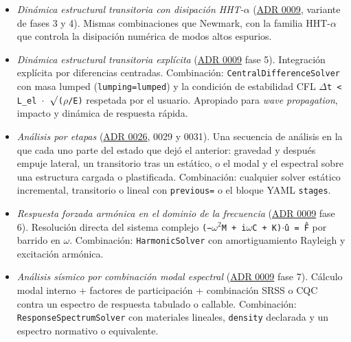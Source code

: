 \documentclass[11pt,oneside]{report}
\begin{document}
\begin{itemize}
  \item \textit{Dinámica estructural transitoria con disipación HHT-\ensuremath{\alpha}} (\hyperref[adr:0009]{ADR 0009}, variante de fases 3 y 4). Mismas combinaciones que Newmark, con la familia HHT-\ensuremath{\alpha} que controla la disipación numérica de modos altos espurios.
  \item \textit{Dinámica estructural transitoria explícita} (\hyperref[adr:0009]{ADR 0009} fase 5). Integración explícita por diferencias centradas. Combinación: \texttt{CentralDifferenceSolver} con masa lumped (\texttt{lumping=\textquotedbl{}lumped\textquotedbl{}}) y la condición de estabilidad CFL \texttt{\ensuremath{\Delta}t \textless{} L\_\allowbreak{}el \ensuremath{\cdot} \ensuremath{\surd}(\ensuremath{\rho}/\allowbreak{}E)} respetada por el usuario. Apropiado para \textit{wave propagation}, impacto y dinámica de respuesta rápida.
  \item \textit{Análisis por etapas} (\hyperref[adr:0026]{ADR 0026}, 0029 y 0031). Una secuencia de análisis en la que cada uno parte del estado que dejó el anterior: gravedad y después empuje lateral, un transitorio tras un estático, o el modal y el espectral sobre una estructura cargada o plastificada. Combinación: cualquier solver estático incremental, transitorio o lineal con \texttt{previous=} o el bloque YAML \texttt{stages}.
  \item \textit{Respuesta forzada armónica en el dominio de la frecuencia} (\hyperref[adr:0009]{ADR 0009} fase 6). Resolución directa del sistema complejo \texttt{(−\ensuremath{\omega}\ensuremath{^{2}}M + i\ensuremath{\omega}C + K)\ensuremath{\cdot}û = F̂} por barrido en \texttt{\ensuremath{\omega}}. Combinación: \texttt{HarmonicSolver} con amortiguamiento Rayleigh y excitación armónica.
  \item \textit{Análisis sísmico por combinación modal espectral} (\hyperref[adr:0009]{ADR 0009} fase 7). Cálculo modal interno + factores de participación + combinación SRSS o CQC contra un espectro de respuesta tabulado o callable. Combinación: \texttt{ResponseSpectrumSolver} con materiales lineales, \texttt{density} declarada y un espectro normativo o equivalente.
\end{itemize}
\end{document}

